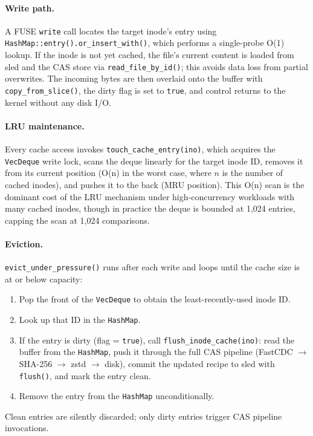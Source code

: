\documentclass[5p,times]{elsarticle}
\begin{document}
\paragraph{Write path.}
A FUSE \texttt{write} call locates the target inode's entry using
\texttt{HashMap::entry().or\_insert\_with()}, which performs a single-probe
O(1) lookup.  If the inode is not yet cached, the file's current content
is loaded from sled and the CAS store via \texttt{read\_file\_by\_id()};
this avoids data loss from partial overwrites.  The incoming bytes are
then overlaid onto the buffer with \texttt{copy\_from\_slice()}, the dirty
flag is set to \texttt{true}, and control returns to the kernel without
any disk I/O.

\paragraph{LRU maintenance.}
Every cache access invokes \texttt{touch\_cache\_entry(ino)}, which
acquires the \texttt{VecDeque} write lock, scans the deque linearly
for the target inode ID, removes it from its current position (O(n) in
the worst case, where $n$ is the number of cached inodes), and pushes it
to the back (MRU position).  This O(n) scan is the dominant cost of the
LRU mechanism under high-concurrency workloads with many cached inodes,
though in practice the deque is bounded at 1,024 entries, capping the
scan at 1,024 comparisons.

\paragraph{Eviction.}
\texttt{evict\_under\_pressure()} runs after each write and loops until
the cache size is at or below capacity:
\begin{enumerate}
\item Pop the front of the \texttt{VecDeque} to obtain the
  least-recently-used inode ID.
\item Look up that ID in the \texttt{HashMap}.
\item If the entry is dirty (flag = \texttt{true}), call
  \texttt{flush\_inode\_cache(ino)}: read the buffer from the
  \texttt{HashMap}, push it through the full CAS pipeline
  (FastCDC $\to$ SHA-256 $\to$ zstd $\to$ disk), commit the updated
  recipe to sled with \texttt{flush()}, and mark the entry clean.
\item Remove the entry from the \texttt{HashMap} unconditionally.
\end{enumerate}
Clean entries are silently discarded; only dirty entries trigger CAS
pipeline invocations.
\end{document}
